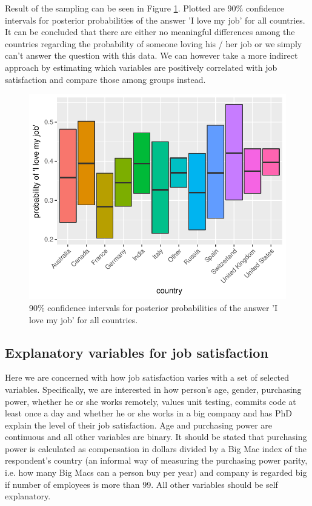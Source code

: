 \documentclass{article}
\begin{document}
Result of the sampling can be seen in Figure \ref{fig_2}. Plotted are 90\% confidence intervals for posterior probabilities of the answer 'I love my job' for all countries. It can be concluded that there are either no meaningful differences among the countries regarding the probability of someone loving his / her job or we simply can't answer the question with this data. We can however take a more indirect approach by estimating which variables are positively correlated with job satisfaction and compare those among groups instead.


\begin{figure}[H]
\centering
\includegraphics{report-012}
\caption{90\% confidence intervals for posterior probabilities of the answer 'I love my job' for all countries.}\label{fig_2}
\end{figure}

\subsection{Explanatory variables for job satisfaction}
Here we are concerned with how job satisfaction varies with a set of selected variables. Specifically, we are interested in how person's age, gender, purchasing power, whether he or she works remotely, values unit testing, commits code at least once a day and whether he or she works in a big company and has PhD explain the level of their job satisfaction. Age and purchasing power are continuous and all other variables are binary. It should be stated that purchasing power is calculated as compensation in dollars divided by a Big Mac index of the respondent's country (an informal way of measuring the purchasing power parity, i.e. how many Big Macs can a person buy per year) and company is regarded big if number of employees is more than 99. All other variables should be self explanatory.
\end{document}
